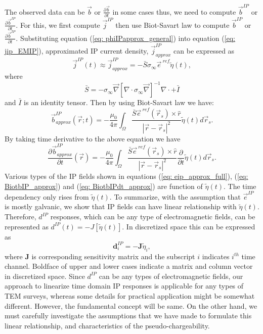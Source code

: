 \documentclass[a4paper, 11pt]{article}
\renewcommand{\div}{\nabla\cdot}
\newcommand{\grad}{\vec \nabla}
\newcommand{\siginf}{\sigma_\infty}
\renewcommand {\j}  { {\vec j} }
\renewcommand {\b}  { {\vec b} }
\newcommand {\e}  { {\vec e} }
\newcommand{\peta}{\tilde{\eta}}
\newcommand{\eref}{\e^{\ ref}}
\newcommand{\dip}{d^{IP}}
\begin{document}
The observed data can be $\b$ or $\frac{\partial \b}{\partial t}$ in some cases thus, we need to compute $\b^{IP}$ or $\frac{\partial \b^{IP}}{\partial t}$.
 For this, we first compute $\j^{IP}$ then use Biot-Savart law to compute $\b^{IP}$ or $\frac{\partial \b^{IP}}{\partial t}$. 
Substituting equation (\ref{eq: phiIPapprox_general}) into equation (\ref{eq: jip_EMIP}), approximated IP current density, $\j^{IP}_{approx}$ can be expressed as
\begin{equation}
  \j^{IP}(t) \approx \j^{IP}_{approx} = -\bar{S}\siginf\eref\peta(t),
  \label{eq: jip_approx}
\end{equation}
where
\begin{equation}
  \bar{S} = -\siginf\grad[\div \siginf\grad]^{-1}\div+\bar{I}
\end{equation}
and $\bar{I}$ is an identity tensor. Then by using Biot-Savart law we have:
\begin{equation}
  \b^{IP}_{approx}(\vec{r}; t) = -\frac{\mu_0}{4\pi}\int_{\Omega}  \frac{\bar{S}\eref(\vec{r}_s)\times\hat{r}}{|\vec{r}-\vec{r}_s|^2}\peta(t)d\vec{r}_s.
  \label{eq: BiotbIP_approx}
\end{equation}
By taking time derivative to the above equation we have
\begin{equation}
  \frac{\partial\b^{IP}_{approx}}{\partial t}(\vec{r}) = -\frac{\mu_0}{4\pi} \int_{\Omega}  \frac{\bar{S}\eref(\vec{r}_s)\times\hat{r}}{|\vec{r}-\vec{r}_s|^2}\frac{\partial}{\partial t}\peta(t)d\vec{r}_s.
  \label{eq: BiotbIPdt_approx}
\end{equation}
Various types of the IP fields shown in equations (\ref{eq: eip_approx_full}), (\ref{eq: BiotbIP_approx}) and (\ref{eq: BiotbIPdt_approx}) are function of $\peta(t)$.
The time dependency only rises from $\peta(t)$. 
To summarize, with the assumption that $\e^{IP}$ is mostly galvanic, we show that IP fields can have linear relationship with $\peta(t)$. Therefore, $\dip$ responses, which can be any type of electromagnetic fields, can be represented as $\dip(t) = -J[\peta(t)]$. In discretized space this can be expressed as
\begin{equation}
  \mathbf{d}^{IP}_i = -\mathbf{J}\peta_i,
  \label{eq: dIP_lineareq}
\end{equation}
where $\mathbf{J}$ is corresponding sensitivity matrix and the subscript $i$ indicates $i^{th}$ time channel. 
Boldface of upper and lower cases indicate a matrix and column vector in discretized space. Since $\dip$ can be any types of electromagnetic fields, our approach to linearize time domain IP responses is applicable for any types of TEM surveys, whereas some details for practical application might be somewhat different. 
However, the fundamental concept will be same. 
On the other hand, we must carefully investigate the assumptions that we have made to formulate this linear relationship, and characteristics of the pseudo-chargeability.
\end{document}
